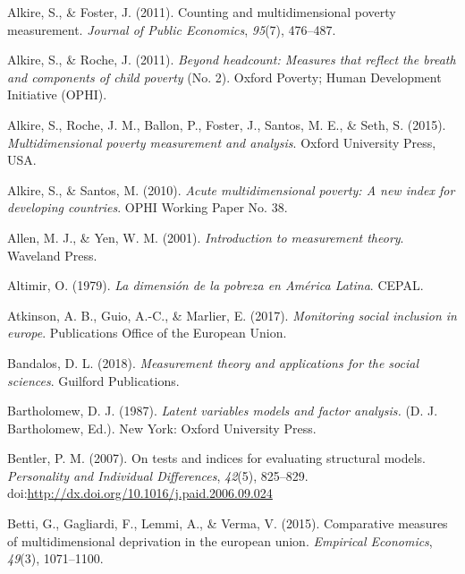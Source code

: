\documentclass[]{book}
\begin{document}
\leavevmode\hypertarget{ref-Alkire2011a}{}%
Alkire, S., \& Foster, J. (2011). Counting and multidimensional poverty measurement. \emph{Journal of Public Economics}, \emph{95}(7), 476--487.

\leavevmode\hypertarget{ref-Alkire2011}{}%
Alkire, S., \& Roche, J. (2011). \emph{Beyond headcount: Measures that reflect the breath and components of child poverty} (No. 2). Oxford Poverty; Human Development Initiative (OPHI).

\leavevmode\hypertarget{ref-Alkire2015}{}%
Alkire, S., Roche, J. M., Ballon, P., Foster, J., Santos, M. E., \& Seth, S. (2015). \emph{Multidimensional poverty measurement and analysis}. Oxford University Press, USA.

\leavevmode\hypertarget{ref-Alkire2010}{}%
Alkire, S., \& Santos, M. (2010). \emph{Acute multidimensional poverty: A new index for developing countries}. OPHI Working Paper No. 38.

\leavevmode\hypertarget{ref-Allen2001}{}%
Allen, M. J., \& Yen, W. M. (2001). \emph{Introduction to measurement theory}. Waveland Press.

\leavevmode\hypertarget{ref-Altimir1979}{}%
Altimir, O. (1979). \emph{La dimensión de la pobreza en América Latina}. CEPAL.

\leavevmode\hypertarget{ref-Atkinson2017}{}%
Atkinson, A. B., Guio, A.-C., \& Marlier, E. (2017). \emph{Monitoring social inclusion in europe}. Publications Office of the European Union.

\leavevmode\hypertarget{ref-Bandalos2018}{}%
Bandalos, D. L. (2018). \emph{Measurement theory and applications for the social sciences}. Guilford Publications.

\leavevmode\hypertarget{ref-Bartholomew1987}{}%
Bartholomew, D. J. (1987). \emph{Latent variables models and factor analysis.} (D. J. Bartholomew, Ed.). New York: Oxford University Press.

\leavevmode\hypertarget{ref-Bentler2007}{}%
Bentler, P. M. (2007). On tests and indices for evaluating structural models. \emph{Personality and Individual Differences}, \emph{42}(5), 825--829. doi:\href{https://doi.org/http://dx.doi.org/10.1016/j.paid.2006.09.024}{http://dx.doi.org/10.1016/j.paid.2006.09.024}

\leavevmode\hypertarget{ref-Betti2015}{}%
Betti, G., Gagliardi, F., Lemmi, A., \& Verma, V. (2015). Comparative measures of multidimensional deprivation in the european union. \emph{Empirical Economics}, \emph{49}(3), 1071--1100.
\end{document}
